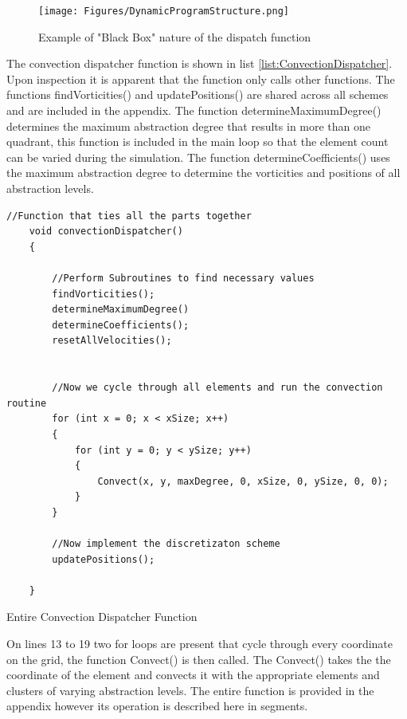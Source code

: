 \begin{figure}[H]
\centering
\texttt{[image: Figures/DynamicProgramStructure.png]}
\caption{\label{fig:ProgramStructure} Example of "Black Box" nature of the dispatch function}
\end{figure} 

The convection dispatcher function is shown in list \ref{list:ConvectionDispatcher}. Upon inspection it is apparent that the function only calls other functions. The functions findVorticities() and updatePositions() are shared across all schemes and are included in the appendix. The function determineMaximumDegree() determines the maximum abstraction degree that results in more than one quadrant, this function is included in the main loop so that the element count can be varied during the simulation. The function determineCoefficients() uses the maximum abstraction degree to determine the vorticities and positions of all abstraction levels.

\begin{listing}[H]
\begin{verbatim}
//Function that ties all the parts together
    void convectionDispatcher()
    {

        //Perform Subroutines to find necessary values
        findVorticities();
        determineMaximumDegree()
        determineCoefficients();
        resetAllVelocities();


        //Now we cycle through all elements and run the convection routine
        for (int x = 0; x < xSize; x++)
        {
            for (int y = 0; y < ySize; y++)
            {
                Convect(x, y, maxDegree, 0, xSize, 0, ySize, 0, 0);
            }
        }

        //Now implement the discretizaton scheme
        updatePositions();

    }
\end{verbatim}
\caption{Entire Convection Dispatcher Function}
\label{list:ConvectionDispatcher}
\end{listing}

On lines 13 to 19 two for loops are present that cycle through every coordinate on the grid, the function Convect() is then called. The Convect() takes the the coordinate of the element and convects it with the appropriate elements and clusters of varying abstraction levels. The entire function is provided in the appendix however its operation is described here in segments.
\\\\

